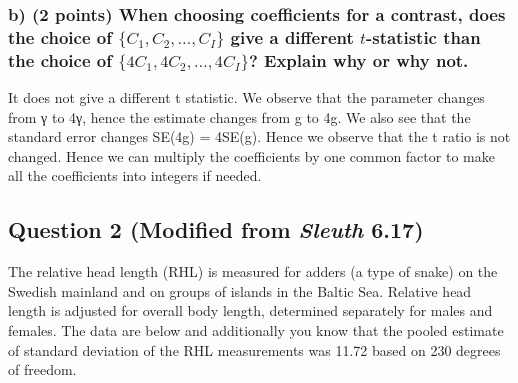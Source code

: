 \documentclass[]{article}
\begin{document}
\subsubsection{\texorpdfstring{b) (2 points) When choosing coefficients
for a contrast, does the choice of \(\{C_1, C_2, \ldots, C_I\}\) give a
different \(t\)-statistic than the choice of
\(\{4C_1, 4C_2, \ldots, 4C_I\}\)? Explain why or why
not.}{b) (2 points) When choosing coefficients for a contrast, does the choice of \textbackslash{}\{C\_1, C\_2, \textbackslash{}ldots, C\_I\textbackslash{}\} give a different t-statistic than the choice of \textbackslash{}\{4C\_1, 4C\_2, \textbackslash{}ldots, 4C\_I\textbackslash{}\}? Explain why or why not.}}\label{b-2-points-when-choosing-coefficients-for-a-contrast-does-the-choice-of-c_1-c_2-ldots-c_i-give-a-different-t-statistic-than-the-choice-of-4c_1-4c_2-ldots-4c_i-explain-why-or-why-not.}

It does not give a different t statistic. We observe that the parameter
changes from γ to 4γ, hence the estimate changes from g to 4g. We also
see that the standard error changes SE(4g) = 4SE(g). Hence we observe
that the t ratio is not changed. Hence we can multiply the coefficients
by one common factor to make all the coefficients into integers if
needed.

\subsection{\texorpdfstring{Question 2 (Modified from \emph{Sleuth}
6.17)}{Question 2 (Modified from Sleuth 6.17)}}\label{question-2-modified-from-sleuth-6.17}

The relative head length (RHL) is measured for adders (a type of snake)
on the Swedish mainland and on groups of islands in the Baltic Sea.
Relative head length is adjusted for overall body length, determined
separately for males and females. The data are below and additionally
you know that the pooled estimate of standard deviation of the RHL
measurements was 11.72 based on 230 degrees of freedom.
\end{document}
